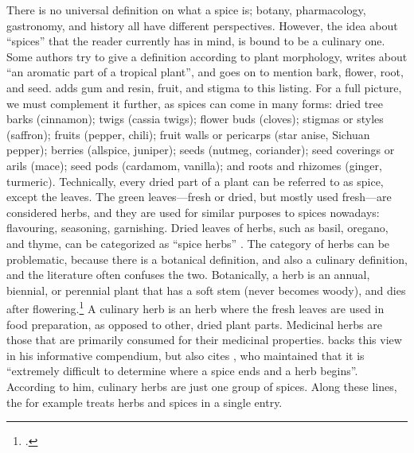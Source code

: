 There is no universal definition on what a spice is; botany, pharmacology, gastronomy, and history all have different perspectives. However, the idea about ``spices'' that the reader currently has in mind, is bound to be a culinary one. Some authors try to give a definition according to plant morphology, \textcite[9]{czarra_spices_2009} writes about ``an aromatic part of a tropical plant'', and goes on to mention bark, flower, root, and seed. \textcite[xix]{turner_spice_2004} adds gum and resin, fruit, and stigma to this listing. For a full picture, we must complement it further, as spices can come in many forms: dried tree barks (cinnamon); twigs
(cassia twigs); flower buds (cloves); stigmas or styles (saffron); fruits (pepper, chili); fruit walls or pericarps (star anise, Sichuan pepper); berries (allspice, juniper); seeds (nutmeg, coriander); seed coverings or arils (mace); seed pods (cardamom, vanilla); and roots and rhizomes (ginger, turmeric). Technically, every dried part of a plant can be referred to as spice, except the leaves. The green leaves---fresh or dried, but mostly used fresh---are considered herbs, and they are used for similar purposes to spices nowadays: flavouring, seasoning, garnishing. Dried leaves of herbs, such as basil, oregano, and thyme, can be categorized as ``spice herbs'' \parencite[see][]{van_wyk_culinary_2014}. The category of herbs can be problematic, because there is a botanical definition, and also a culinary definition, and the literature often confuses the two. Botanically, a herb is an annual, biennial, or perennial plant that has a soft stem (never becomes woody), and dies after flowering.\footcite[herb]{oed} A culinary herb is an herb where the fresh leaves are used in food preparation, as opposed to other, dried plant parts. Medicinal herbs are those that are primarily consumed for their medicinal properties. \textcite[9,16]{oconnell_book_2016} backs this view in his informative compendium, but also cites \textcite[16]{rosengarten_book_1973}, who maintained that it is ``extremely difficult to determine where a spice ends and a herb begins''. According to him, culinary herbs are just one group of spices. Along these lines, the \textcite{britannica_spice_nodate} for example treats herbs and spices in a single entry. 

